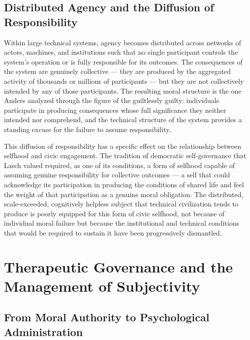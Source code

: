 \documentclass[12pt]{memoir}
\begin{document}
\subsection{Distributed Agency and the Diffusion of Responsibility}

Within large technical systems, agency becomes distributed across networks of actors,
machines, and institutions such that no single participant controls the system's
operation or is fully responsible for its outcomes. The consequences of the system are
genuinely collective — they are produced by the aggregated activity of thousands or
millions of participants — but they are not collectively intended by any of those
participants. The resulting moral structure is the one Anders analyzed through the
figure of the guiltlessly guilty: individuals participate in producing consequences
whose full significance they neither intended nor comprehend, and the technical
structure of the system provides a standing excuse for the failure to assume
responsibility.

This diffusion of responsibility has a specific effect on the relationship between
selfhood and civic engagement. The tradition of democratic self-governance that Lasch
valued required, as one of its conditions, a form of selfhood capable of assuming
genuine responsibility for collective outcomes — a self that could acknowledge its
participation in producing the conditions of shared life and feel the weight of that
participation as a genuine moral obligation. The distributed, scale-exceeded,
cognitively helpless subject that technical civilization tends to produce is poorly
equipped for this form of civic selfhood, not because of individual moral failure but
because the institutional and technical conditions that would be required to sustain
it have been progressively dismantled.

\section{Therapeutic Governance and the Management of Subjectivity}
\label{sec:therapy}

\subsection{From Moral Authority to Psychological Administration}
\end{document}
